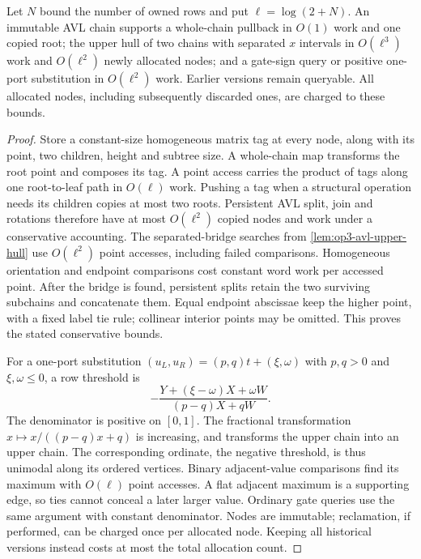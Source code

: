 \begin{lemma}
\label{lem:op3-persistent-projective-chain}
Let $N$ bound the number of owned rows and put $\ell=\log(2+N)$.
An immutable AVL chain supports a whole-chain pullback in $O(1)$ work and one
copied root; the upper hull of two chains with separated $x$ intervals in
$O(\ell^3)$ work and $O(\ell^2)$ newly allocated nodes; and a gate-sign query
or positive one-port substitution in $O(\ell^2)$ work. Earlier versions remain
queryable. All allocated nodes, including subsequently discarded ones, are
charged to these bounds.
\end{lemma}
\begin{proof}
Store a constant-size homogeneous matrix tag at every node, along with its
point, two children, height and subtree size. A whole-chain map transforms the
root point and composes its tag. A point access carries the product of tags
along one root-to-leaf path in $O(\ell)$ work. Pushing a tag when a structural
operation needs its children copies at most two roots. Persistent AVL split,
join and rotations therefore have at most $O(\ell^2)$ copied nodes and work
under a conservative accounting. The separated-bridge searches from
\cref{lem:op3-avl-upper-hull} use $O(\ell^2)$ point accesses, including failed
comparisons. Homogeneous orientation and endpoint comparisons cost constant
word work per accessed point. After the bridge is found, persistent splits
retain the two surviving subchains and concatenate them. Equal endpoint
abscissae keep the higher point, with a fixed label tie rule; collinear
interior points may be omitted. This proves the stated conservative bounds.

For a one-port substitution
$(u_L,u_R)=(p,q)t+(\xi,\omega)$ with $p,q>0$ and $\xi,\omega\leq0$, a row threshold is
\[
 -\frac{Y+(\xi-\omega)X+\omega W}{(p-q)X+qW}.
\]
The denominator is positive on $[0,1]$. The fractional transformation
$x\mapsto x/((p-q)x+q)$ is increasing, and transforms the upper chain into
an upper chain. The corresponding ordinate, the negative threshold, is thus
unimodal along its ordered vertices. Binary adjacent-value comparisons find
its maximum with $O(\ell)$ point accesses. A flat adjacent maximum is a
supporting edge, so ties cannot conceal a later larger value. Ordinary gate
queries use the same argument with constant denominator. Nodes are immutable;
reclamation, if performed, can be charged once per allocated node. Keeping
all historical versions instead costs at most the total allocation count.
\end{proof}

